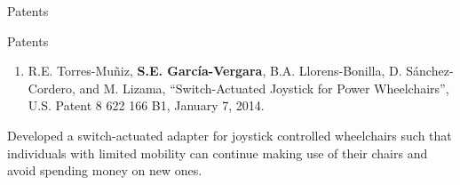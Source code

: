 \documentclass{resume} %
\newcommand{\sectionspace}{\vspace{3mm}}
\begin{document}


\sectionspace

\begin{rSection}{Patents}

\begin{rSubsection}{Patents}{}{}{}
\item
\begin{enumerate}
\item R.E. Torres-Mu\~{n}iz, \textbf{S.E. Garc\'{i}a-Vergara},
  B.A. Llorens-Bonilla, D. S\'{a}nchez-Cordero, and M. Lizama, ``Switch-Actuated
  Joystick for Power Wheelchairs'', U.S. Patent 8 622 166 B1, January 7, 2014.
\end{enumerate}

Developed a switch-actuated adapter for joystick controlled wheelchairs such
that individuals with limited mobility can continue making use of their chairs
and avoid spending money on new ones.


\end{rSubsection}
\end{rSection}




\iffalse
\sectionspace
\begin{rSection}{Invited Talks \& Demonstrations}

\begin{enumerate}
\item one
\end{enumerate}


\end{rSection}
\fi






\sectionspace
\end{document}
